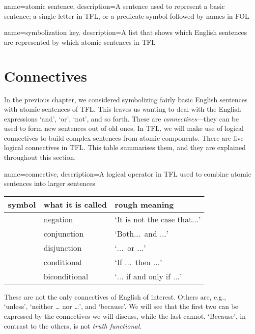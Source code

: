 {
name=atomic sentence,
description={A sentence used to represent a basic sentence; a single letter in TFL, or a predicate symbol followed by names in FOL}
}

{
name=symbolization key,
description={A list that shows which English sentences are represented by which \glspl{atomic sentence} in TFL}
}

\chapter{Connectives}
\label{s:TFLConnectives}

In the previous chapter, we considered symbolizing fairly basic English sentences with atomic sentences of TFL. This leaves us wanting to deal with the English expressions `and', `or', `not', and so forth. These are \emph{connectives}---they can be used to form new sentences out of old ones. In TFL, we will make use of logical connectives to build complex sentences from atomic components. There are five logical connectives in TFL. This table summarises them, and they are explained throughout this section.

{
name=connective,
description={A logical operator in TFL used to combine \glspl{atomic sentence} into larger sentences}
}
	\begin{table}[h]
	\center
	\begin{tabular}{l l l}
	
	\textbf{symbol}&\textbf{what it is called}&\textbf{rough meaning}\\
	\hline
	\enot&negation&`It is not the case that$\ldots$'\\
	\eand&conjunction&`Both$\ldots$\ and $\ldots$'\\
	\eor&disjunction&`$\ldots$\ or $\ldots$'\\
	\eif&conditional&`If $\ldots$\ then $\ldots$'\\
	\eiff&biconditional&`$\ldots$ if and only if $\ldots$'\\
	
	\end{tabular}
	\end{table}

These are not the only connectives of English of interest. Others are, e.g., `unless', `neither \dots{} nor \dots', and `because'. We will see that the first two can be expressed by the connectives we will discuss, while the last cannot. `Because', in contrast to the others, is not \emph{truth functional}.

